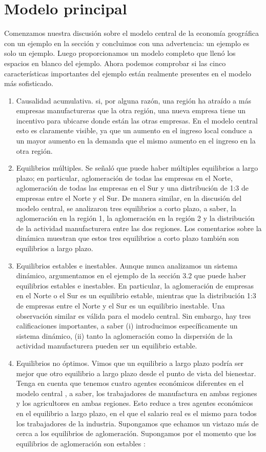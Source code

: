 \section{Modelo principal}
Comenzamos nuestra discusión sobre el modelo central de la economía geográfica con un ejemplo en la sección  y concluimos con una advertencia: un ejemplo es solo un ejemplo. Luego proporcionamos un modelo completo que llenó los espacios en blanco del ejemplo. Ahora podemos comprobar si las cinco características importantes del ejemplo están realmente presentes en el modelo más sofisticado.
\begin{enumerate}
    \item Causalidad acumulativa.  si, por alguna razón, una región ha atraído a más empresas manufactureras que la otra región, una nueva empresa tiene un incentivo para ubicarse donde están las otras empresas. En el modelo central esto es claramente visible,  ya que un aumento en el ingreso local conduce a un mayor aumento en la demanda que el mismo aumento en el ingreso en la otra región.
    \item Equilibrios múltiples. Se señaló  que puede haber múltiples equilibrios a largo plazo; en particular, aglomeración de todas las empresas en el Norte, aglomeración de todas las empresas en el Sur y una distribución de 1:3 de empresas entre el Norte y el Sur. De manera similar, en la discusión del modelo central,  se analizaron tres equilibrios a corto plazo, a saber, la aglomeración en la región 1, la aglomeración en la región 2 y la distribución de la actividad manufacturera entre las dos regiones. Los comentarios sobre la dinámica muestran que estos tres equilibrios a corto plazo también son equilibrios a largo plazo.
    \item Equilibrios estables e inestables. Aunque nunca analizamos un sistema dinámico, argumentamos en el ejemplo de la sección 3.2 que puede haber equilibrios estables e inestables. En particular, la aglomeración de empresas en el Norte o el Sur es un equilibrio estable, mientras que la distribución 1:3 de empresas entre el Norte y el Sur es un equilibrio inestable. Una observación similar es válida para el modelo central. Sin embargo, hay tres calificaciones importantes, a saber (i) introducimos específicamente un sistema dinámico,  (ii) tanto la aglomeración como la dispersión de la actividad manufacturera pueden ser un equilibrio estable.
    \item Equilibrios no óptimos. Vimos que un equilibrio a largo plazo podría ser mejor que otro equilibrio a largo plazo desde el punto de vista del bienestar. Tenga en cuenta que tenemos cuatro agentes económicos diferentes en el modelo central , a saber, los trabajadores de manufactura en ambas regiones y los agricultores en ambas regiones. Esto reduce a tres agentes económicos en el equilibrio a largo plazo, en el que el salario real es el mismo para todos los trabajadores de la industria. Supongamos que echamos un vistazo más de cerca a los equilibrios de aglomeración.  Supongamos por el momento que los equilibrios de aglomeración son estables :\\\\

\end{enumerate}

